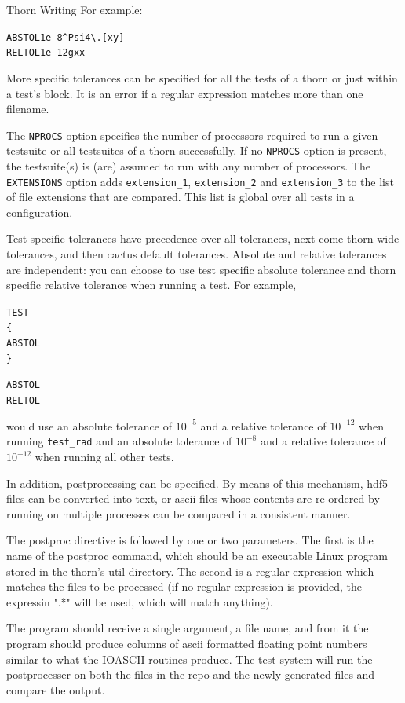 \begin{cactuspart}{Thorn Writing}
For example:

\begin{alltt}
ABSTOL 1e-8 ^Psi4\textbackslash.[xy]
RELTOL 1e-12 gxx
\end{alltt}

More specific tolerances can be specified for all the tests of a thorn
or just within a test's block. It is an error if a regular expression
matches more than one filename.

The \texttt{NPROCS} option specifies the number of processors required to
run a given testsuite  or all testsuites of a thorn
successfully. If no \texttt{NPROCS} option is present, the testsuite(s)
is (are) assumed to run with any number of processors.
The \texttt{EXTENSIONS} option adds
\verb|extension_1|, \verb|extension_2| and \verb|extension_3| to the
list of file extensions that are compared. This list is global over
all tests in a configuration.

Test specific tolerances have precedence over all tolerances, next
come thorn wide tolerances, and then cactus default tolerances.
Absolute and relative tolerances are independent: you can choose to
use test specific absolute tolerance and thorn specific relative
tolerance when running a test. For example,

\begin{alltt}
TEST 
\{
  ABSTOL 
\}

ABSTOL  
RELTOL  
\end{alltt}

would use an absolute tolerance of $10^{-5}$ and a relative tolerance of
$10^{-12}$ when running \verb|test_rad| and an absolute tolerance of $10^{-8}$
and a relative tolerance of $10^{-12}$ when running all other tests.

In addition, postprocessing can be specified. By means of this mechanism,
hdf5 files can be converted into text, or ascii files whose contents are re-ordered
by running on multiple processes can be compared in a consistent manner.

The postproc directive is followed by one or two parameters. The first is the
name of the postproc command, which should be an executable Linux program stored
in the thorn's util directory. The second is a regular expression which matches
the files to be processed (if no regular expression is provided, the expressin ".*" will be used, which will match anything).

The program should receive a single argument, a file name, and from it the program
should produce columns of ascii formatted floating
point numbers similar to what the IOASCII routines produce.
The test system will run the postprocesser on both the files
in the repo and the newly generated files and compare the output.


\end{cactuspart}
